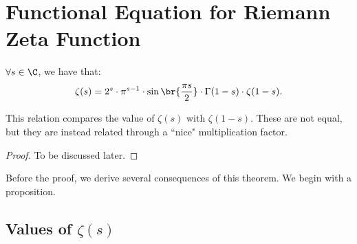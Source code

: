 \setcounter{section}{0}
\setcounter{theorem}{0}


\section{Functional Equation for Riemann Zeta Function}


\begin{theorem}\label{thm:r-func-eq}
$\forall s \in \C$, we have that:
\begin{align*}
    \zeta(s) = 2^s \cdot \pi^{s-1} \cdot \sin\br{\frac{\pi s}{2}} \cdot \Gamma(1-s) \cdot \zeta(1-s).
\end{align*}

\end{theorem}

\begin{note}
This relation compares the value of $\zeta(s) $ with $\zeta (1-s)$. These are not equal, but they are instead related through a ``nice" multiplication factor.
\end{note}

\begin{proof}
To be discussed later.
\end{proof}

Before the proof, we derive several consequences of this theorem. We begin with a proposition.



\subsection{Values of $\zeta(s)$}

